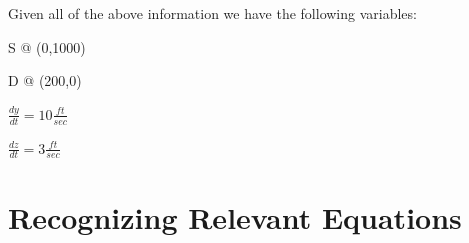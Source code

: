 \documentclass{article}
\begin{document}
\vspace{.5cm}
Given all of the above information we have the following variables:

\vspace{.25cm}
S @ (0,1000)

\vspace{.25cm}
D @ (200,0)

\vspace{.25cm}
$ \frac{dy}{dt} = 10\frac{ft}{sec} $

\vspace{.25cm}
$ \frac{dz}{dt} = 3\frac{ft}{sec} $ 

\section{Recognizing Relevant Equations}
\end{document}
